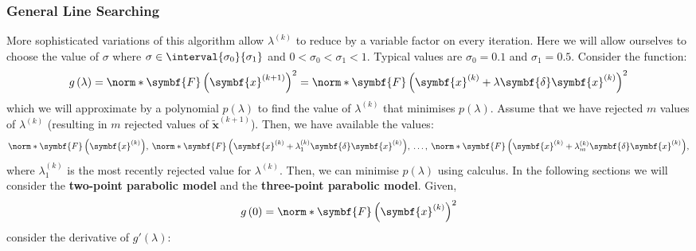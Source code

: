 \documentclass{article}
\begin{document}
\subsubsection{General Line Searching}
More sophisticated variations of this algorithm allow \(\lambda^{\left(
k \right)}\) to reduce by a variable factor on every iteration. Here we
will allow ourselves to choose the value of \(\sigma\) where \(\sigma
\in \interval{\sigma_0}{\sigma_1}\) and \(0 < \sigma_0 < \sigma_1 <
1\). Typical values are \(\sigma_0 = 0.1\) and \(\sigma_1 = 0.5\).
Consider the function:
\begin{equation*}
    g\left( \lambda \right) = \norm*{\symbf{F}\left( \symbf{x}^{\left( k+1 \right)} \right)}^2 = \norm*{\symbf{F}\left( \symbf{x}^{\left( k \right)} + \lambda \symbf{\delta}\symbf{x}^{\left( k \right)} \right)}^2
\end{equation*}
which we will approximate by a polynomial \(p\left( \lambda \right)\) to
find the value of \(\lambda^{\left( k \right)}\) that minimises
\(p\left( \lambda \right)\). Assume that we have rejected \(m\) values
of \(\lambda^{\left( k \right)}\) (resulting in \(m\) rejected values of
\(\tilde{\symbf{x}}^{\left( k+1 \right)}\)). Then, we have available the
values:
\begin{equation*}
    \norm*{\symbf{F}\left( \symbf{x}^{\left( k \right)} \right)},\: \norm*{\symbf{F}\left( \symbf{x}^{\left( k \right)} + \lambda_1^{\left( k \right)} \symbf{\delta}\symbf{x}^{\left( k \right)} \right)},\: \ldots,\: \norm*{\symbf{F}\left( \symbf{x}^{\left( k \right)} + \lambda_m^{\left( k \right)} \symbf{\delta}\symbf{x}^{\left( k \right)} \right)},
\end{equation*}
where \(\lambda_1^{\left( k \right)}\) is the most recently rejected
value for \(\lambda^{\left( k \right)}\). Then, we can minimise \(p\left( \lambda \right)\)
using calculus. In the following sections we will consider the
\textbf{two-point parabolic model} and the \textbf{three-point parabolic model}.
Given,
\begin{equation*}
    g\left( 0 \right) = \norm*{\symbf{F}\left( \symbf{x}^{\left( k \right)} \right)}^2
\end{equation*}
consider the derivative of \(g'\left( \lambda \right)\):
\end{document}
